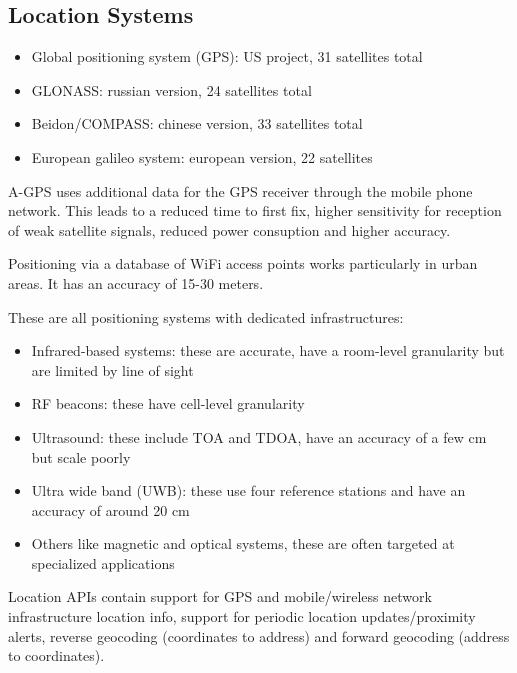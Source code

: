 \subsection{Location Systems}
\begin{mytitle}\hfill
\begin{itemize}
    \item Global positioning system (GPS): US project, 31 satellites total
    \item GLONASS: russian version, 24 satellites total
    \item Beidon/COMPASS: chinese version, 33 satellites total
    \item European galileo system: european version, 22 satellites
\end{itemize}
\end{mytitle}
\begin{mytitle} A-GPS uses additional data for the GPS receiver through the mobile phone network. This leads to a reduced time to first fix, higher sensitivity for reception of weak satellite signals, reduced power consuption and higher accuracy.
\end{mytitle}
\begin{mytitle} Positioning via a database of WiFi access points works particularly in urban areas. It has an accuracy of 15-30 meters.
\end{mytitle}
\begin{mytitle} These are all positioning systems with dedicated infrastructures:
\begin{itemize}
    \item Infrared-based systems: these are accurate, have a room-level granularity but are limited by line of sight
    \item RF beacons: these have cell-level granularity
    \item Ultrasound: these include TOA and TDOA, have an accuracy of a few cm but scale poorly
    \item Ultra wide band (UWB): these use four reference stations and have an accuracy of around 20 cm
    \item Others like magnetic and optical systems, these are often targeted at specialized applications
\end{itemize}
\end{mytitle}
\begin{mytitle} Location APIs contain support for GPS and mobile/wireless network infrastructure location info, support for periodic location updates/proximity alerts, reverse geocoding (coordinates to address) and forward geocoding (address to coordinates).
\end{mytitle}